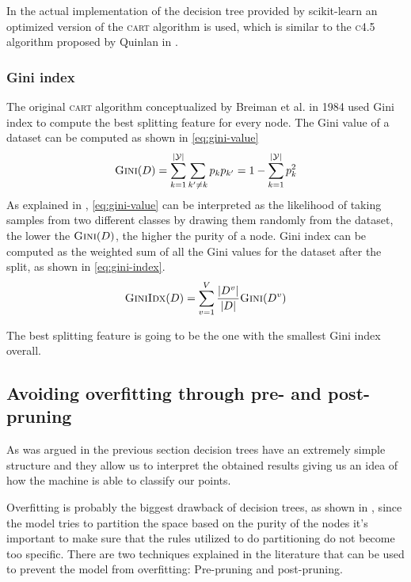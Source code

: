 In the actual implementation of the decision tree provided by scikit-learn an optimized version of
the \textsc{cart} algorithm is used, which  is similar to the \textsc{c4.5} algorithm proposed by Quinlan in
\cite{quinlan2014c4}.

\subsubsection{Gini index}
The original \textsc{cart} algorithm conceptualized by Breiman et al. in 1984
\cite{breiman1984classification} used Gini index to compute the best splitting feature for every
node. The Gini value of a dataset can be computed as shown in \cref{eq:gini-value}
\begin{equation}
	\label{eq:gini-value}
	\textsc{Gini}(D) = \sum_{k = 1}^{|\mathcal{Y}|}\sum_{k' \neq k} p_kp_{k'} = 1 - \sum_{k =
		1}^{|\mathcal{Y}|}p_k^2
\end{equation}
As explained in \cite{ZhouZhi-Hua2021ML}, \cref{eq:gini-value} can be interpreted as the
likelihood of taking samples from two different classes by drawing them randomly from the
dataset, the lower the $\textsc{Gini}(D)$, the higher the purity of a node. Gini index can be
computed as the weighted sum of all the Gini values for the dataset after the split, as shown in
\cref{eq:gini-index}.
\begin{equation}
	\label{eq:gini-index}
	\textsc{GiniIdx}(D) = \sum_{v = 1}^V\frac{|D^v|}{|D|} \textsc{Gini}(D^v)
\end{equation}

The best splitting feature is going to be the one with the smallest Gini index overall.

\subsection{Avoiding overfitting through pre- and post- pruning}
As was argued in the previous section decision trees have an extremely simple structure and they
allow us to interpret the obtained results giving us an idea of how the machine is able to classify
our points.

Overfitting is probably the biggest drawback of decision trees, as shown in
\cite{overfitting-dt-erblin}, since the model tries to partition the space based on the purity of
the nodes it's important to make sure that the rules utilized to do partitioning do not become too
specific. There are two techniques explained in the literature that can be used to prevent the model
from overfitting: Pre-pruning and post-pruning.

